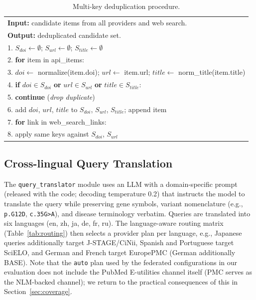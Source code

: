 \documentclass[nonacm,sigconf]{acmart}
\begin{document}
\begin{table}[t]
\centering
\small
\caption{Multi-key deduplication procedure.}
\label{tab:dedup}
\begin{tabular}{@{}p{7.6cm}@{}}
\toprule
\footnotesize
\textbf{Input:} candidate items from all providers and web search. \\
\textbf{Output:} deduplicated candidate set. \\
\midrule
\footnotesize
1. $S_{doi} \gets \emptyset$; $S_{url} \gets \emptyset$; $S_{title} \gets \emptyset$ \\
2. \textbf{for} item in api\_items: \\
3. \quad $doi \gets$ normalize(item.doi); $url \gets$ item.url; $title \gets$ norm\_title(item.title) \\
4. \quad \textbf{if} $doi \in S_{doi}$ \textbf{or} $url \in S_{url}$ \textbf{or} $title \in S_{title}$: \\
5. \quad\quad \textbf{continue} \quad (\emph{drop duplicate}) \\
6. \quad add $doi$, $url$, $title$ to $S_{doi}$, $S_{url}$, $S_{title}$; append item \\
7. \textbf{for} link in web\_search\_links: \\
8. \quad apply same keys against $S_{doi}$, $S_{url}$ \\
\bottomrule
\end{tabular}
\end{table}

\subsection{Cross-lingual Query Translation}
\label{sec:translation}

The \texttt{query\_translator} module uses an LLM with a domain-specific
prompt (released with the code; decoding temperature 0.2) that instructs the
model to translate the query while preserving gene
symbols, variant nomenclature (e.g., \texttt{p.G12D}, \texttt{c.35G>A}),
and disease terminology verbatim. Queries are translated into six languages
(en, zh, ja, de, fr, ru). The language-aware routing matrix
(Table~\ref{tab:routing}) then selects a provider plan per language, e.g.,
Japanese queries additionally target J-STAGE/CiNii, Spanish and
Portuguese target SciELO, and German and French target EuropePMC
(German additionally BASE). Note that the \texttt{auto} plan used by the
federated configurations in our evaluation does not include the PubMed
E-utilities channel itself (PMC serves as the NLM-backed channel); we
return to the practical consequences of this in
Section~\ref{sec:coverage}.
\end{document}
